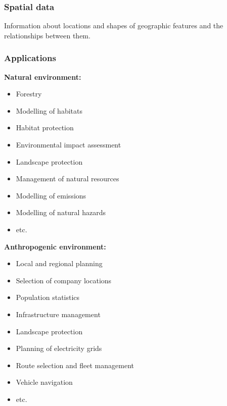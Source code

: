 \documentclass{article}
\begin{document}
\subsubsection{Spatial data}
Information about locations and shapes of geographic features and the
relationships between them.

\subsubsection{Applications}
\begin{minipage}[t]{0.48\textwidth}
    \textbf{Natural environment:}
    \begin{itemize}
        \item Forestry
        \item Modelling of habitats
        \item Habitat protection
        \item Environmental impact assessment
        \item Landscape protection
        \item Management of natural resources
        \item Modelling of emissions
        \item Modelling of natural hazards
        \item etc.
    \end{itemize}
\end{minipage}
\hfill
\begin{minipage}[t]{0.48\textwidth}
    \textbf{Anthropogenic environment:}
    \begin{itemize}
        \item Local and regional planning
        \item Selection of company locations
        \item Population statistics
        \item Infrastructure management
        \item Landscape protection
        \item Planning of electricity grids
        \item Route selection and fleet management
        \item Vehicle navigation
        \item etc.
    \end{itemize}
\end{minipage}
\end{document}
